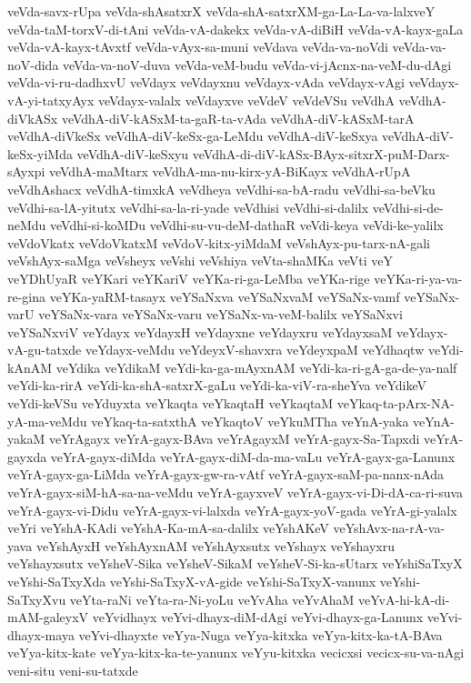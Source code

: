 {veVda-savx-rUpa
veVda-shAsatxrX
veVda-shA-satxrXM-ga-La-La-va-lalxveY
veVda-taM-torxV-di-tAni
veVda-vA-dakekx
veVda-vA-diBiH
veVda-vA-kayx-gaLa
veVda-vA-kayx-tAvxtf
veVda-vAyx-sa-muni
veVdava
veVda-va-noVdi
veVda-va-noV-dida
veVda-va-noV-duva
veVda-veM-budu
veVda-vi-jAcnx-na-veM-du-dAgi
veVda-vi-ru-dadhxvU
veVdayx
veVdayxnu
veVdayx-vAda
veVdayx-vAgi
veVdayx-vA-yi-tatxyAyx
veVdayx-valalx
veVdayxve
veVdeV
veVdeVSu
veVdhA
veVdhA-diVkASx
veVdhA-diV-kASxM-ta-gaR-ta-vAda
veVdhA-diV-kASxM-tarA
veVdhA-diVkeSx
veVdhA-diV-keSx-ga-LeMdu
veVdhA-diV-keSxya
veVdhA-diV-keSx-yiMda
veVdhA-diV-keSxyu
veVdhA-di-diV-kASx-BAyx-sitxrX-puM-Darx-sAyxpi
veVdhA-maMtarx
veVdhA-ma-nu-kirx-yA-BiKayx
veVdhA-rUpA
veVdhAshacx
veVdhA-timxkA
veVdheya
veVdhi-sa-bA-radu
veVdhi-sa-beVku
veVdhi-sa-lA-yitutx
veVdhi-sa-la-ri-yade
veVdhisi
veVdhi-si-dalilx
veVdhi-si-de-neMdu
veVdhi-si-koMDu
veVdhi-su-vu-deM-dathaR
veVdi-keya
veVdi-ke-yalilx
veVdoVkatx
veVdoVkatxM
veVdoV-kitx-yiMdaM
veVshAyx-pu-tarx-nA-gali
veVshAyx-saMga
veVsheyx
veVshi
veVshiya
veVta-shaMKa
veVti
veY
veYDhUyaR
veYKari
veYKariV
veYKa-ri-ga-LeMba
veYKa-rige
veYKa-ri-ya-va-re-gina
veYKa-yaRM-tasayx
veYSaNxva
veYSaNxvaM
veYSaNx-vamf
veYSaNx-varU
veYSaNx-vara
veYSaNx-varu
veYSaNx-va-veM-balilx
veYSaNxvi
veYSaNxviV
veYdayx
veYdayxH
veYdayxne
veYdayxru
veYdayxsaM
veYdayx-vA-gu-tatxde
veYdayx-veMdu
veYdeyxV-shavxra
veYdeyxpaM
veYdhaqtw
veYdi-kAnAM
veYdika
veYdikaM
veYdi-ka-ga-mAyxnAM
veYdi-ka-ri-gA-ga-de-ya-nalf
veYdi-ka-rirA
veYdi-ka-shA-satxrX-gaLu
veYdi-ka-viV-ra-sheYva
veYdikeV
veYdi-keVSu
veYduyxta
veYkaqta
veYkaqtaH
veYkaqtaM
veYkaq-ta-pArx-NA-yA-ma-veMdu
veYkaq-ta-satxthA
veYkaqtoV
veYkuMTha
veYnA-yaka
veYnA-yakaM
veYrAgayx
veYrA-gayx-BAva
veYrAgayxM
veYrA-gayx-Sa-Tapxdi
veYrA-gayxda
veYrA-gayx-diMda
veYrA-gayx-diM-da-ma-vaLu
veYrA-gayx-ga-Lanunx
veYrA-gayx-ga-LiMda
veYrA-gayx-gw-ra-vAtf
veYrA-gayx-saM-pa-nanx-nAda
veYrA-gayx-siM-hA-sa-na-veMdu
veYrA-gayxveV
veYrA-gayx-vi-Di-dA-ca-ri-suva
veYrA-gayx-vi-Didu
veYrA-gayx-vi-lalxda
veYrA-gayx-yoV-gada
veYrA-gi-yalalx
veYri
veYshA-KAdi
veYshA-Ka-mA-sa-dalilx
veYshAKeV
veYshAvx-na-rA-va-yava
veYshAyxH
veYshAyxnAM
veYshAyxsutx
veYshayx
veYshayxru
veYshayxsutx
veYsheV-Sika
veYsheV-SikaM
veYsheV-Si-ka-sUtarx
veYshiSaTxyX
veYshi-SaTxyXda
veYshi-SaTxyX-vA-gide
veYshi-SaTxyX-vanunx
veYshi-SaTxyXvu
veYta-raNi
veYta-ra-Ni-yoLu
veYvAha
veYvAhaM
veYvA-hi-kA-di-mAM-galeyxV
veYvidhayx
veYvi-dhayx-diM-dAgi
veYvi-dhayx-ga-Lanunx
veYvi-dhayx-maya
veYvi-dhayxte
veYya-Nuga
veYya-kitxka
veYya-kitx-ka-tA-BAva
veYya-kitx-kate
veYya-kitx-ka-te-yanunx
veYyu-kitxka
vecicxsi
vecicx-su-va-nAgi
veni-situ
veni-su-tatxde
}
